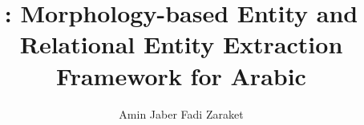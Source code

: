 \documentclass[english,utf8x]{article-hermes}
\title[\framework]{\framework: Morphology-based Entity and Relational Entity Extraction Framework for Arabic}
\author{Amin Jaber \andauthor Fadi Zaraket}
\begin{document}
\maketitlepage
\end{document}
